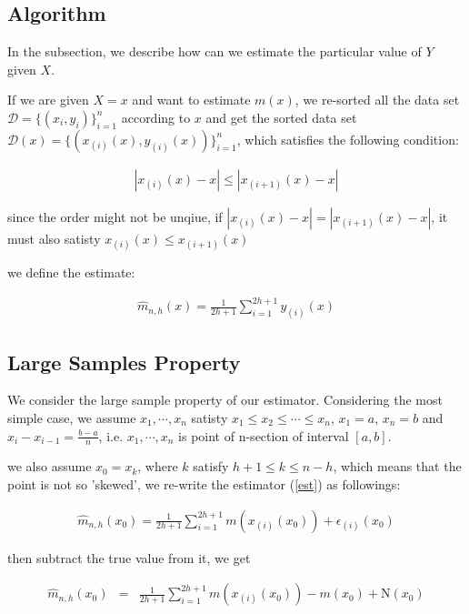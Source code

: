 \documentclass[twoside]{article}
\begin{document}
\subsection{Algorithm}

In the subsection, we describe how can we estimate the particular value of $Y$ given $X$.

If we are given $X=x$ and want to estimate $m(x)$, we re-sorted all the data set $\mathcal{D}=\{(x_i,y_i)\}_{i=1}^n$ according to $x$ and get the sorted data set $\mathcal{D}(x)=\{(x_{(i)}(x),y_{(i)}(x))\}_{i=1}^n$, which satisfies the following condition:

\begin{eqnarray}
  |x_{(i)}(x)-x|\le|x_{(i+1)}(x)-x|
\end{eqnarray}

since the order might not be unqiue, if $|x_{(i)}(x)-x|=|x_{(i+1)}(x)-x|$, it must also satisty $x_{(i)}(x)\le x_{(i+1)}(x)$

we define the estimate:

\begin{eqnarray}
\label{est}
  \hat{m}_{n,h}(x)=\frac{1}{2h+1}\sum_{i=1}^{2h+1}{y_{(i)}(x)}
\end{eqnarray}

\subsection{Large Samples Property}

We consider the large sample property of our estimator. Considering the most simple case, we assume $x_1,\cdots,x_n$ satisty $x_1\le x_2\le \cdots \le x_n$, $x_1=a$, $x_n=b$ and $x_i-x_{i-1}=\frac{b-a}{n}$, i.e. $x_1,\cdots,x_n$ is point of n-section of interval $[a,b]$.

we also assume $x_0=x_k$, where $k$ satisfy $h+1\le k\le n-h$, which means that the point is not so 'skewed', we re-write the estimator (\ref{est}) as followings:

\begin{eqnarray}
  \hat{m}_{n,h}(x_0)=\frac{1}{2h+1}\sum_{i=1}^{2h+1}{m(x_{(i)}(x_0))+\epsilon_{(i)}(x_0)} \nonumber
\end{eqnarray} 

then subtract the true value from it, we get

\begin{eqnarray}
  \hat{m}_{n,h}(x_0)&=&\frac{1}{2h+1}\sum_{i=1}^{2h+1}{m(x_{(i)}(x_0))-m(x_0)}+\mathrm{N}(x_0) \nonumber
\end{eqnarray} 
\end{document}
